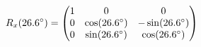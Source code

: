 \documentclass[preview]{standalone}
\begin{document}
\begin{align*}
\special{dvisvgm:raw <g id='unique000'>}R_x(26.6^\circ) = \begin{pmatrix} 1 & 0 & 0 \\ 0 & \cos(26.6^\circ) & -\sin(26.6^\circ) \\ 0 & \sin(26.6^\circ) & \cos(26.6^\circ) \end{pmatrix}\special{dvisvgm:raw </g>}
\end{align*}
\end{document}
